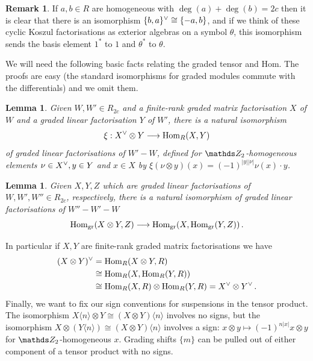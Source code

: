 \documentclass{compositio}
\newtheorem{lemma}[theorem]{Lemma}
\theoremstyle{definition}
\newtheorem{remark}[theorem]{Remark}
\numberwithin{equation}{section}
\def\Hom{\operatorname{Hom}}
\begin{document}
\begin{remark}\label{remark:dual_koszul_cyclic} If $a,b \in R$ are homogeneous with $\deg(a) + \deg(b) = 2c$ then it is clear that there is an isomorphism $\{ b, a \}^{\vee} \cong \{-a, b\}$, and if we think of these cyclic Koszul factorisations as exterior algebras on a symbol $\theta$, this isomorphism sends the basis element $1^*$ to $1$ and $\theta^*$ to $\theta$.
\end{remark}

We will need the following basic facts relating the graded tensor and Hom. The proofs are easy (the standard isomorphisms for graded modules commute with the differentials) and we omit them.

\begin{lemma}\label{lemma:homdual} Given $W, W' \in R_{2c}$ and a finite-rank graded matrix factorisation $X$ of $W$ and a graded linear factorisation $Y$ of $W'$, there is a natural isomorphism
\[
\xi: X\mdual \otimes Y \lto \Hom_R(X,Y)
\]
of graded linear factorisations of $W' - W$, defined for $\Ztwo$-homogeneous elements $\nu \in X^{\vee}, y \in Y$ and $x \in X$ by $\xi( \nu \otimes y )(x) = (-1)^{|y||\nu|} \nu(x) \cdot y$.
\end{lemma}

\begin{lemma} Given $X,Y,Z$ which are graded linear factorisations of $W, W', W'' \in R_{2c}$, respectively, there is a natural isomorphism of graded linear factorisations of $W'' - W' - W$
\[
\Hom_{\text{gr}}(X \otimes Y, Z) \lto \Hom_{\text{gr}}(X, \Hom_{\text{gr}}(Y,Z)) \, .
\]
\end{lemma}

In particular if $X, Y$ are finite-rank graded matrix factorisations we have
\begin{align}
(X \otimes Y)\mdual &= \Hom_R(X \otimes Y, R) \nonumber \\
&\cong \Hom_R(X, \Hom_R(Y,R)) \nonumber \\
&\cong \Hom_R(X,R) \otimes \Hom_R(Y,R) = X\mdual \otimes Y\mdual \, . \label{eq:dual_tensor}
\end{align}
Finally, we want to fix our sign conventions for suspensions in the tensor product. The isomorphism $X\langle n \rangle \otimes Y \cong (X \otimes Y)\langle n \rangle$ involves no signs, but the isomorphism $X \otimes (Y \langle n \rangle) \cong (X \otimes Y)\langle n \rangle$ involves a sign: $x \otimes y \longmapsto (-1)^{n|x|} x \otimes y$ for $\Ztwo$-homogeneous $x$. Grading shifts $\{ m \}$ can be pulled out of either component of a tensor product with no signs.
\\
\end{document}
